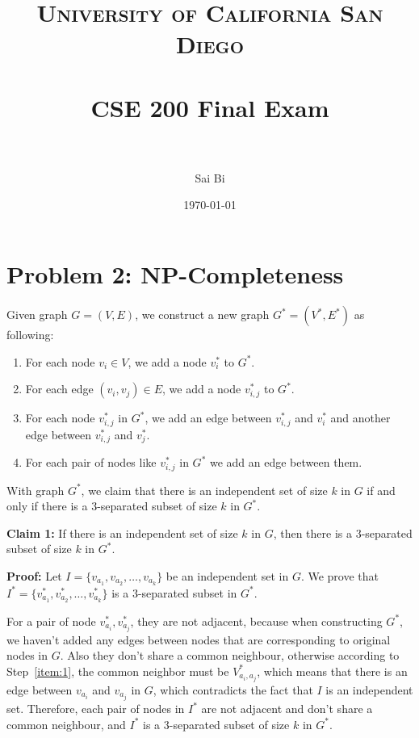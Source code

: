 \documentclass[paper=a4, fontsize=11pt]{scrartcl} %
\title{	
\normalfont \normalsize 
\textsc{University of California San Diego} \\ [25pt] %
\horrule{0.5pt} \\[0.4cm] %
\huge CSE 200 Final Exam\\ %
\horrule{2pt} \\[0.5cm] %
}
\author{Sai Bi} %
\date{\normalsize\today} %
\numberwithin{equation}{section} %
\numberwithin{figure}{section} %
\numberwithin{table}{section} %
\begin{document}
\maketitle %


\section*{Problem 2: NP-Completeness}
Given graph $G = (V, E)$, we construct a new graph $G^* = (V^*, E^*)$ as following:
\begin{enumerate}
  \item For each node $v_i \in V$, we add a node $v_i^*$ to $G^*$.
  \item For each edge $(v_i, v_j) \in E$, we add a node $v^*_{i, j}$ to $G^*$.
  \item \label{item:1}
    For each node $v^*_{i, j}$ in $G^*$, we add an edge between $v_{i, j}^*$ and $v_i^*$ and
    another edge between $v_{i, j}^*$ and $v_j^*$.
  \item For each pair of nodes like $v_{i, j}^*$ in $G^*$ we add an edge between them. 
\end{enumerate}

With graph $G^*$, we claim that there is an independent set of size $k$ in $G$ if and only if there is a
$3$-separated subset of size $k$ in $G^*$.

\vspace{0.2cm}
\textbf{Claim 1:}
If there is an independent set of size $k$ in $G$, then there is a $3$-separated subset of size $k$ in $G^*$.

\textbf{Proof:}
Let $I = \{v_{a_1}, v_{a_2},\dots, v_{a_k}\}$ be an independent set in $G$. We prove that 
$I^* = \{v_{a_1}^*,  v_{a_2}^*,\dots, v_{a_k}^*\}$ is a $3$-separated subset in $G^*$.

For a pair of node $v^*_{a_i}, v_{a_j}^*$, they are not adjacent, because when constructing $G^*$,
we haven't added any edges between  nodes that are corresponding to original nodes in $G$. Also they
don't share a common neighbour, otherwise according to Step~\ref{item:1}, the common neighbor must
be $V^*_{a_i, a_j}$, which means that there is an edge between $v_{a_i}$ and $v_{a_j}$ in $G$,
which contradicts the fact that $I$ is an independent set. Therefore, each pair of nodes in $I^*$
are not adjacent and don't share a common neighbour, and $I^*$ is a $3$-separated subset of size $k$
in $G^*$.
\end{document}
